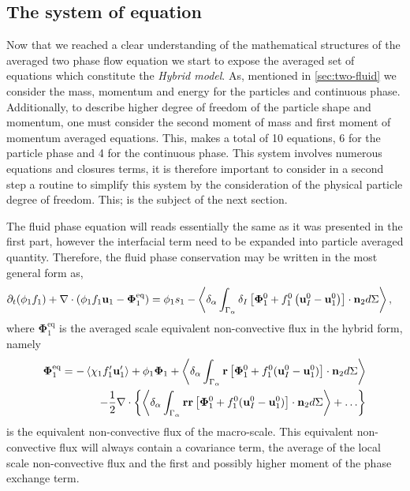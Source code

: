 \subsection{The system of equation}
Now that we reached a clear understanding of the mathematical structures of the averaged two phase flow equation we start to expose the averaged set of equations which constitute the \textit{Hybrid model}. 
As, mentioned in \ref{sec:two-fluid} we consider the mass, momentum and energy for the particles and continuous phase. 
Additionally, to describe higher degree of freedom of the particle shape and momentum, one must consider the second moment of mass and first moment of momentum averaged equations. 
This, makes a total of 10 equations, 6 for the particle phase and 4 for the continuous phase.
This system involves numerous equations and closures terms, it is therefore important to consider in a second step a routine to simplify this system by the consideration of the physical particle degree of freedom.
This; is the subject of the next section.    


The fluid phase equation will reads essentially the same as it was presented in the first part, however the interfacial term need to be expanded into particle averaged quantity. 
Therefore, the fluid phase conservation may be written in the most general form as, 
\begin{align}
    \partial_t (\phi_1 f_1)
    +\mathbf{\nabla}\cdot (\phi_1 f_1 \textbf{u}_1  - \bm\Phi_1^\text{eq})
    &= 
    \phi_1 s_1
    - \left<\delta_\alpha \int_{\Gamma_\alpha} \delta_I\left[
        \bm{\Phi}_1^0
        + f_1^0
        \left(
            \textbf{u}_I^0
            - \textbf{u}_1^0
        \right)
    \right]
    \cdot \textbf{n}_2 d\Sigma\right> ,
    \label{eq:dt_f_1_hybrid}
\end{align}
where $\bm\Phi_1^\text{eq}$ is the averaged scale equivalent non-convective flux in the hybrid form, namely 
\begin{align}
    \bm\Phi_1^\text{eq}
    = 
    - \left<\chi_1 f_1' \textbf{u}_1'\right>
    + \phi_1 \bm\Phi_1
    + \left<\delta_\alpha \int_{\Gamma_\alpha} \textbf{r} \left[
        \bm{\Phi}_1^0
        + f_1^0 (\textbf{u}_I^0-\textbf{u}_1^0)
    \right]\cdot \textbf{n}_2 d\Sigma\right>\\
    - \frac{1}{2}\mathbf{\nabla}\cdot\left\{
        \left<\delta_\alpha \int_{\Gamma_\alpha} \textbf{rr} \left[
            \bm{\Phi}_1^0
            + f_1^0 (\textbf{u}_I^0-\textbf{u}_1^0)
            \right]\cdot \textbf{n}_2 d\Sigma\right>
            +\ldots
        \right\}
\end{align}
is the equivalent non-convective flux of the macro-scale. 
This equivalent non-convective flux will always contain a covariance term, the average of the local scale non-convective flux and the first and possibly higher moment of the phase exchange term. 

